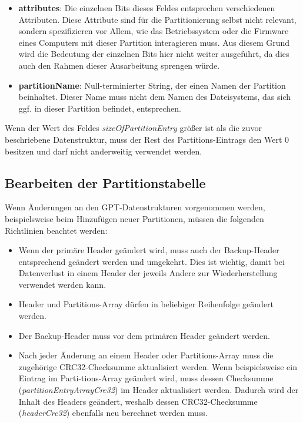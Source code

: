 \begin{itemize}
    \item \textbf{attributes}:
    Die einzelnen Bits dieses Feldes entsprechen verschiedenen Attributen.
    Diese Attribute sind für die Partitionierung selbst nicht relevant, sondern spezifizieren vor Allem, wie das Betriebssystem oder die Firmware eines Computers mit dieser Partition interagieren muss.
    Aus diesem Grund wird die Bedeutung der einzelnen Bits hier nicht weiter ausgeführt, da dies auch den Rahmen dieser Ausarbeitung sprengen würde.
    
    \item \textbf{partitionName}:
    Null-terminierter String, der einen Namen der Partition beinhaltet.
    Dieser Name muss nicht dem Namen des Dateisystems, das sich ggf. in dieser Partition befindet, entsprechen.

\end{itemize}

Wenn der Wert des Feldes \textit{sizeOfPartitionEntry} größer ist als die zuvor beschriebene Datenstruktur, muss der Rest des Partitions-Eintrags den Wert 0 besitzen und darf nicht anderweitig verwendet werden.\cite{uefi-spec}

\newpage
\subsection{Bearbeiten der Partitionstabelle}
Wenn Änderungen an den GPT-Datenstrukturen vorgenommen werden, beispielsweise beim Hinzufügen neuer Partitionen, müssen die folgenden Richtlinien beachtet werden:

\begin{itemize}
    \item Wenn der primäre Header geändert wird, muss auch der Backup-Header entsprechend geändert werden und umgekehrt.
    Dies ist wichtig, damit bei Datenverlust in einem Header der jeweils Andere zur Wiederherstellung verwendet werden kann.

    \item Header und Partitions-Array dürfen in beliebiger Reihenfolge geändert werden.
    
    \item Der Backup-Header muss vor dem primären Header geändert werden.

    \item Nach jeder Änderung an einem Header oder Partitions-Array muss die zugehörige CRC32-Checksumme aktualisiert werden.
    Wenn beispielsweise ein Eintrag im Parti-tions-Array geändert wird, muss dessen Checksumme (\textit{partitionEntryArrayCrc32}) im Header aktualisiert werden.
    Dadurch wird der Inhalt des Headers geändert, weshalb dessen CRC32-Checksumme (\textit{headerCrc32}) ebenfalls neu berechnet werden muss.
\end{itemize}

